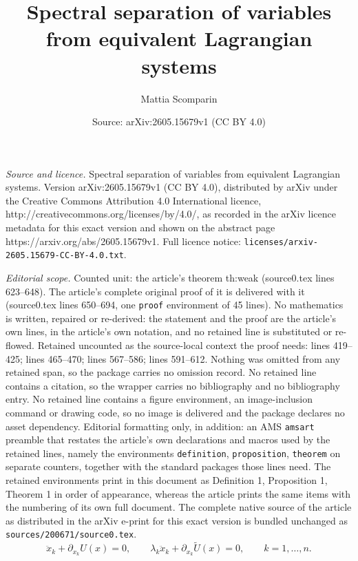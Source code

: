 \documentclass[10pt,a4paper]{amsart}
\title{Spectral separation of variables from equivalent Lagrangian systems}
\author{Mattia Scomparin}
\date{Source: arXiv:2605.15679v1 (CC BY 4.0)}
\begin{document}
\maketitle

\noindent\emph{Source and licence.} Spectral separation of variables from equivalent Lagrangian systems. Version arXiv:2605.15679v1 (CC BY 4.0), distributed by arXiv under the Creative Commons Attribution 4.0 International licence, http://creativecommons.org/licenses/by/4.0/, as recorded in the arXiv licence metadata for this exact version and shown on the abstract page https://arxiv.org/abs/2605.15679v1. Full licence notice: \texttt{licenses/arxiv-2605.15679-CC-BY-4.0.txt}.\par\smallskip

\noindent\textit{Editorial scope.} Counted unit: the article's theorem th:weak (source0.tex lines 623--648). The article's complete original proof of it is delivered with it (source0.tex lines 650--694, one \texttt{proof} environment of 45 lines). No mathematics is written, repaired or re-derived: the statement and the proof are the article's own lines, in the article's own notation, and no retained line is substituted or re-flowed.  Retained uncounted as the source-local context the proof needs: lines 419--425; lines 465--470; lines 567--586; lines 591--612.  Nothing was omitted from any retained span, so the package carries no omission record.  No retained line contains a citation, so the wrapper carries no bibliography and no bibliography entry.  No retained line contains a figure environment, an image-inclusion command or drawing code, so no image is delivered and the package declares no asset dependency.  Editorial formatting only, in addition: an AMS \texttt{amsart} preamble that restates the article's own declarations and macros used by the retained lines, namely the environments \texttt{definition}, \texttt{proposition}, \texttt{theorem} on separate counters, together with the standard packages those lines need.  The retained environments print in this document as Definition 1, Proposition 1, Theorem 1 in order of appearance, whereas the article prints the same items with the numbering of its own full document.  The complete native source of the article as distributed in the arXiv e-print for this exact version is bundled unchanged as \texttt{sources/200671/source0.tex}.
\begin{equation}
\label{eq:xEoM}
\ddot{x}_k + \partial_{x_k}U(x) = 0,
\qquad
\lambda_k \ddot{x}_k + \partial_{x_k} \widetilde U(x) = 0,
\qquad k = 1,\dots,n.
\end{equation}
\end{document}
